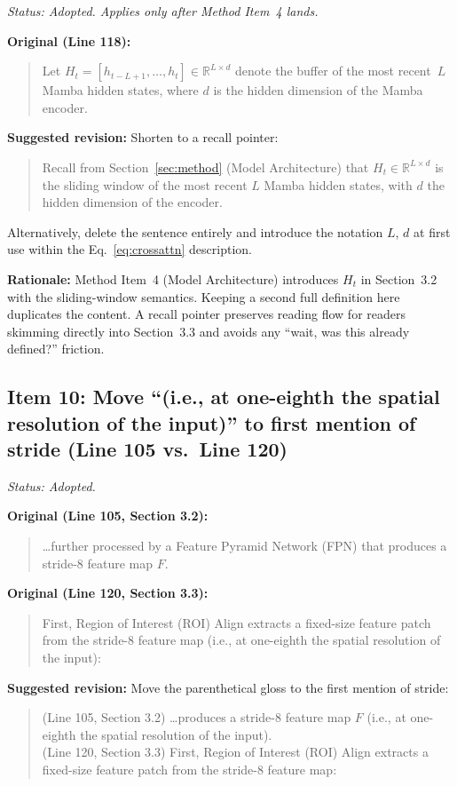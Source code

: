 \documentclass{article}
\begin{document}
\textit{Status: Adopted. Applies only after Method Item~4 lands.}

\textbf{Original (Line 118):}
\begin{quote}
Let $H_t = [h_{t-L+1}, \ldots, h_t] \in \mathbb{R}^{L \times d}$ denote the buffer of the most recent~$L$ Mamba hidden states, where $d$ is the hidden dimension of the Mamba encoder.
\end{quote}

\textbf{Suggested revision:}
Shorten to a recall pointer:
\begin{quote}
Recall from Section~\ref{sec:method} (Model Architecture) that $H_t \in \mathbb{R}^{L \times d}$ is the sliding window of the most recent $L$ Mamba hidden states, with $d$ the hidden dimension of the encoder.
\end{quote}
Alternatively, delete the sentence entirely and introduce the notation $L$, $d$ at first use within the Eq.~\ref{eq:crossattn} description.

\textbf{Rationale:}
Method Item~4 (Model Architecture) introduces $H_t$ in Section~3.2 with the sliding-window semantics. Keeping a second full definition here duplicates the content. A recall pointer preserves reading flow for readers skimming directly into Section~3.3 and avoids any ``wait, was this already defined?'' friction.

\subsection*{Item 10: Move ``(i.e., at one-eighth the spatial resolution of the input)'' to first mention of stride (Line 105 vs.\ Line 120)}

\textit{Status: Adopted.}

\textbf{Original (Line 105, Section 3.2):}
\begin{quote}
\ldots further processed by a Feature Pyramid Network (FPN) that produces a stride-8 feature map $F$.
\end{quote}

\textbf{Original (Line 120, Section 3.3):}
\begin{quote}
First, Region of Interest (ROI) Align \cite{he2017mask} extracts a fixed-size feature patch from the stride-8 feature map (i.e., at one-eighth the spatial resolution of the input):
\end{quote}

\textbf{Suggested revision:}
Move the parenthetical gloss to the first mention of stride:
\begin{quote}
(Line 105, Section 3.2) \ldots produces a stride-8 feature map $F$ (i.e., at one-eighth the spatial resolution of the input).\\
(Line 120, Section 3.3) First, Region of Interest (ROI) Align \cite{he2017mask} extracts a fixed-size feature patch from the stride-8 feature map:
\end{quote}
\end{document}
